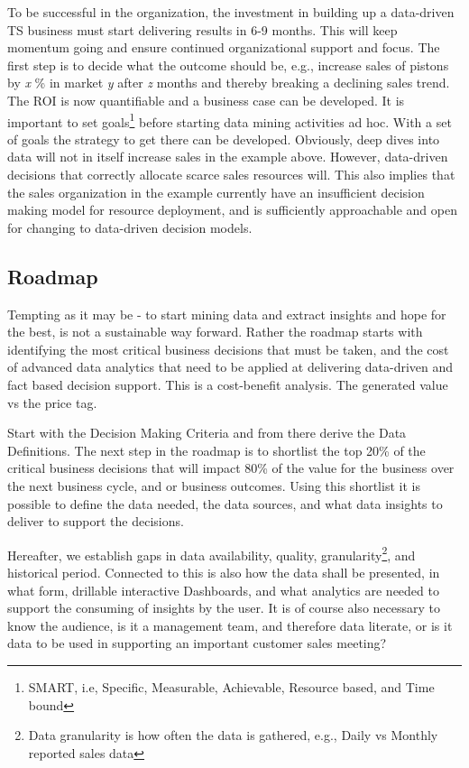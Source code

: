 \documentclass[10pt]{article} %
\begin{document}
To be successful in the organization, the investment in building up a data-driven TS business must start delivering results in 6-9 months. This will keep momentum going and ensure continued organizational support and focus. The first step is to decide what the outcome should be, e.g., increase sales of pistons by \textit{x} \% in market \textit{y} after \textit{z} months and thereby breaking a declining sales trend. The ROI is now quantifiable and a business case can be developed. It is important to set goals\footnote{SMART, i.e, Specific, Measurable, Achievable, Resource based, and Time bound} before starting data mining activities ad hoc. With a set of goals the strategy to get there can be developed. Obviously, deep dives into data will not in itself increase sales in the example above. However, data-driven decisions that correctly allocate scarce sales resources will. This also implies that the sales organization in the example currently have an insufficient decision making model for resource deployment, and is sufficiently approachable and open for changing to data-driven decision models.


\subsection{Roadmap}

Tempting as it may be - to start mining data and extract insights and hope for the best, is not a sustainable way forward. Rather the roadmap starts with identifying the most critical business decisions that must be taken, and the cost of advanced data analytics that need to be applied at delivering data-driven and fact based decision support. This is a cost-benefit analysis. The generated value vs the price tag.

Start with the Decision Making Criteria and from there derive the Data Definitions. The next step in the roadmap is to shortlist the top 20\% of the critical business decisions that will impact 80\% of the value for the business over the next business cycle, and or business outcomes. Using this shortlist it is possible to define the data needed, the data sources, and what data insights to deliver to support the decisions.

Hereafter, we establish gaps in data availability, quality, granularity\footnote{Data granularity is how often the data is gathered, e.g., Daily vs Monthly reported sales data}, and historical period. Connected to this is also how the data shall be presented, in what form, drillable interactive Dashboards, and what analytics are needed to support the consuming of insights by the user. It is of course also necessary to know the audience, is it a management team, and therefore data literate, or is it data to be used in supporting an important customer sales meeting?
\end{document}
